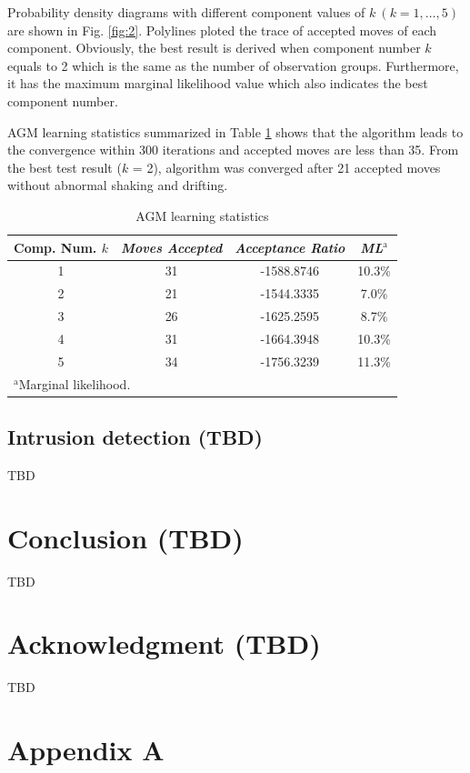 \documentclass[conference]{IEEEtran}
\begin{document}
Probability density diagrams with different component values of $k\ (k = 1,\dots,5)$ are shown in Fig. \ref{fig:2}. Polylines ploted the trace of accepted moves of each component. Obviously, the best result is derived when component number $k$ equals to 2 which is the same as the number of observation groups. Furthermore, it has the maximum marginal likelihood value which also indicates the best component number.

AGM learning statistics summarized in Table \ref{tab1} shows that the algorithm leads to the convergence within 300 iterations and accepted moves are less than 35. From the best test result ($k$ = 2), algorithm was converged after 21 accepted moves without abnormal shaking and drifting.

\begin{table}[b]
\caption{AGM learning statistics}
\begin{center}
\begin{tabular}{|c|c|c|c|}
\hline
\textbf{Comp. Num. $k$} & \textbf{\textit{Moves Accepted}}& \textbf{\textit{Acceptance Ratio}}& \textbf{\textit{ML$^{\mathrm{a}}$}} \\
\hline
1 & 31 & -1588.8746 & 10.3\%  \\
2 & 21 & -1544.3335 & 7.0\% \\
3 & 26 & -1625.2595 & 8.7\% \\
4 & 31 & -1664.3948 & 10.3\% \\
5 & 34 & -1756.3239 & 11.3\% \\
\hline
\multicolumn{4}{l}{$^{\mathrm{a}}$Marginal likelihood.}
\end{tabular}
\label{tab1}
\end{center}
\end{table}

\subsection{Intrusion detection (TBD)}
TBD

\section{Conclusion (TBD)}
TBD

\section*{Acknowledgment (TBD)}
TBD

\section*{Appendix A}
\end{document}
